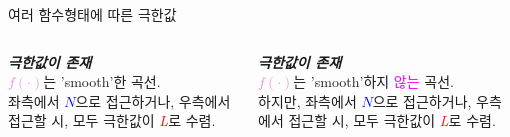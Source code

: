 \documentclass[aspectratio=169]{beamer}
\begin{document}
\begin{frame}{여러 함수형태에 따른 극한값}
  \vspace{1em}

  \begin{columns}
    \begin{column}{0.5\textwidth}
      \footnotesize
      \textbf{\emph{극한값이 존재}}\\
      \small \textcolor{violet}{$f(\cdot)$}는 'smooth'한 곡선.\\
      좌측에서 \textcolor{blue}{$N$}으로 접근하거나, 우측에서 접근할 시, 모두 극한값이 \textcolor{red}{\emph{L}}로 수렴.
    \end{column}
    \begin{column}{0.5\textwidth}
      \footnotesize
      \textbf{\emph{극한값이 존재}}\\
      \small \textcolor{violet}{$f(\cdot)$}는 'smooth'하지 \textcolor{magenta}{않는} 곡선.\\
      하지만, 좌측에서 \textcolor{blue}{$N$}으로 접근하거나, 우측에서 접근할 시, 모두 극한값이 \textcolor{red}{\emph{L}}로 수렴.
    \end{column}
  \end{columns}
\end{frame}
\end{document}
